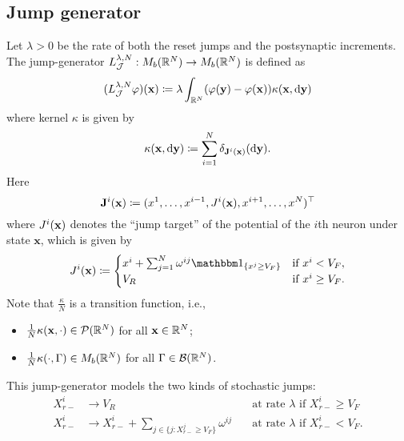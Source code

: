 \subsection{Jump generator}
Let $\lambda > 0$ be the rate of both the reset jumps and the postsynaptic increments.
The jump-generator $L_{\mathcal{J}}^{\lambda, N} : M_b(\mathbb{R}^N) \to M_b(\mathbb{R}^N)$ is defined as
\begin{equation}
    (L_{\cJ}^{\lambda, N}\varphi) (\bm{x}) \coloneqq \lambda \int_{\potspace^N} \br{\varphi(\bm{y}) - \varphi(\bm{x})} \kappa(\bm{x}, \odif{\bm{y}})
\end{equation}
where kernel $\kappa$ is given by
\begin{equation}
    \kappa(\bm{x},\odif{\bm{y}}) \coloneqq \sum_{i=1}^N \delta_{\bm{\jtarg}^i(\bm{x})}(\odif{\bm{y}}).
\end{equation}
Here
\begin{equation}
    \mathbf{J}^i(\mathbf{x}) \coloneqq (x^1,\dots,x^{i-1},J^i(\mathbf{x}),x^{i+1},\dots,x^N)^\top
\end{equation}
where $J^i(\mathbf{x})$ denotes the \enquote{jump target} of the potential of the $i$th neuron under state $\bm{x}$, which is given by
\begin{equation}
    \jtarg^i(\bm{x})
    \coloneqq \begin{cases}
        x^i + \sum_{j=1}^N \omega^{ij} \ind{x^j \geq V_F} &\text{if } x^i < V_F, \\
        V_R &\text{if } x^i \geq V_F.
    \end{cases}
\end{equation}
Note that $\frac{\kappa}{N}$ is a transition function, i.e.,
\begin{itemize}
    \item $\frac{1}{N} \kappa(\mathbf{x},\cdot) \in \mathcal{P}(\mathbb{R}^N)$ for all $\mathbf{x} \in \mathbb{R}^N$;
    \item $\frac{1}{N} \kappa(\cdot, \Gamma) \in M_b(\mathbb{R}^N)$ for all $\Gamma \in \mathcal{B}(\mathbb{R}^N)$.
\end{itemize}

\smallskip

This jump-generator models the two kinds of stochastic jumps:
\begin{align}
    X_{r-}^i &\to V_R &\quad\text{at rate } \lambda \text{ if } X_{r-}^i \geq V_F \\
    X_{r-}^i &\to X_{r-}^i + \sum_{j \in \{j : X_{r-}^j \geq V_F\}} \omega^{ij} &\quad\text{at rate } \lambda \text{ if } X_{r-}^i < V_F.
\end{align}
